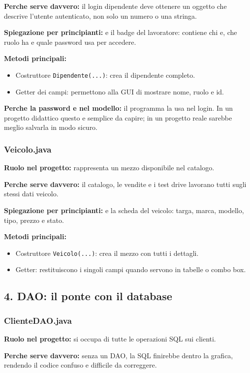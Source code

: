 \documentclass[12pt,a4paper]{article}
\begin{document}
\textbf{Perche serve davvero:} il login dipendente deve ottenere un oggetto che descrive l'utente autenticato, non solo un numero o una stringa.

\textbf{Spiegazione per principianti:} e il badge del lavoratore: contiene chi e, che ruolo ha e quale password usa per accedere.

\textbf{Metodi principali:}
\begin{itemize}
  \item Costruttore \texttt{Dipendente(...)}: crea il dipendente completo.
  \item Getter dei campi: permettono alla GUI di mostrare nome, ruolo e id.
\end{itemize}

\textbf{Perche la password e nel modello:} il programma la usa nel login. In un progetto didattico questo e semplice da capire; in un progetto reale sarebbe meglio salvarla in modo sicuro.

\subsubsection*{Veicolo.java}
\textbf{Ruolo nel progetto:} rappresenta un mezzo disponibile nel catalogo.

\textbf{Perche serve davvero:} il catalogo, le vendite e i test drive lavorano tutti sugli stessi dati veicolo.

\textbf{Spiegazione per principianti:} e la scheda del veicolo: targa, marca, modello, tipo, prezzo e stato.

\textbf{Metodi principali:}
\begin{itemize}
  \item Costruttore \texttt{Veicolo(...)}: crea il mezzo con tutti i dettagli.
  \item Getter: restituiscono i singoli campi quando servono in tabelle o combo box.
\end{itemize}

\subsection{4. DAO: il ponte con il database}

\subsubsection*{ClienteDAO.java}
\textbf{Ruolo nel progetto:} si occupa di tutte le operazioni SQL sui clienti.

\textbf{Perche serve davvero:} senza un DAO, la SQL finirebbe dentro la grafica, rendendo il codice confuso e difficile da correggere.
\end{document}
